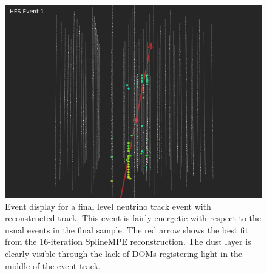 \documentclass{gatech-thesis}
\begin{document}
\begin{figure}[ht]
  \begin{center}
    \includegraphics[width=1.0\textwidth,keepaspectratio]{HES_Upgoing_WithReco.png}
  \end{center}
  \caption{Event display for a final level neutrino track event with reconstructed track. This event is fairly energetic with respect to the usual events in the final sample. The red arrow shows the best fit from the 16-iteration SplineMPE reconstruction. The dust layer is clearly visible through the lack of DOMs registering light in the middle of the event track.}
  \label{fig:HESEventWithReco}
\end{figure}
\end{document}

